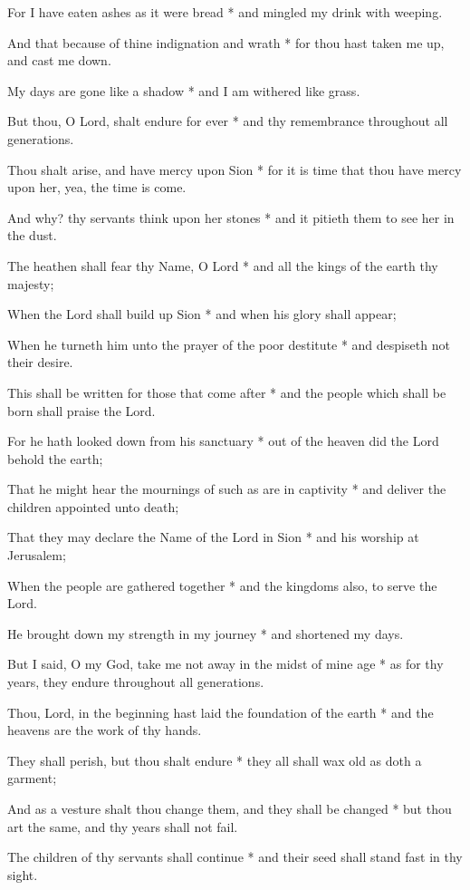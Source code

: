 For I have eaten ashes as it were bread * and mingled my drink with weeping.

And that because of thine indignation and wrath * for thou hast taken me up, and cast me down.

My days are gone like a shadow * and I am withered like grass.

But thou, O Lord, shalt endure for ever * and thy remembrance throughout all generations.

Thou shalt arise, and have mercy upon Sion * for it is time that thou have mercy upon her, yea, the time is come.

And why? thy servants think upon her stones * and it pitieth them to see her in the dust.

The heathen shall fear thy Name, O Lord * and all the kings of the earth thy majesty;

When the Lord shall build up Sion * and when his glory shall appear;

When he turneth him unto the prayer of the poor destitute * and despiseth not their desire.

This shall be written for those that come after * and the people which shall be born shall praise the Lord.

For he hath looked down from his sanctuary * out of the heaven did the Lord behold the earth;

That he might hear the mournings of such as are in captivity * and deliver the children appointed unto death;

That they may declare the Name of the Lord in Sion * and his worship at Jerusalem;

When the people are gathered together * and the kingdoms also, to serve the Lord.

He brought down my strength in my journey * and shortened my days.

But I said, O my God, take me not away in the midst of mine age * as for thy years, they endure throughout all generations.

Thou, Lord, in the beginning hast laid the foundation of the earth * and the heavens are the work of thy hands.

They shall perish, but thou shalt endure * they all shall wax old as doth a garment;

And as a vesture shalt thou change them, and they shall be changed * but thou art the same, and thy years shall not fail.

The children of thy servants shall continue * and their seed shall stand fast in thy sight.

